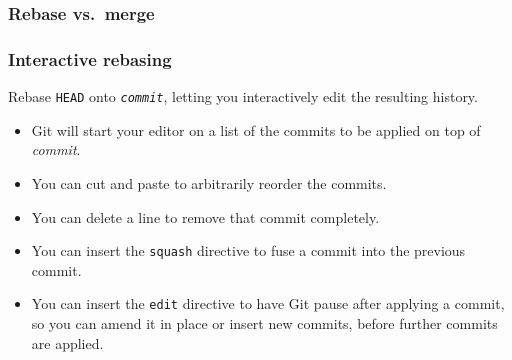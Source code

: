 \documentclass{beamer}
\begin{document}
\begin{frame}
  \frametitle{Rebase vs.\ merge}
  \begin{itemize}
  \end{itemize}
    \begin{center}
  \end{center}
\end{frame}

\begin{frame}
  \frametitle{Interactive rebasing}
  \begin{description}
  \item[\texttt{git rebase -i \textit{commit}}\hfill] Rebase
    \texttt{HEAD} onto \texttt{\textit{commit}}, letting you
    interactively edit the resulting history.
  \end{description}

  \begin{itemize}
  \item Git will start your editor on a list of the commits to be
    applied on top of \textit{commit}.
  \item You can cut and paste to arbitrarily reorder the commits.
  \item You can delete a line to remove that commit completely.
  \item You can insert the \texttt{squash} directive to fuse a commit
    into the previous commit.
  \item You can insert the \texttt{edit} directive to have Git pause
    after applying a commit, so you can amend it in place or insert
    new commits, before further commits are applied.
  \end{itemize}
\end{frame}
\end{document}
